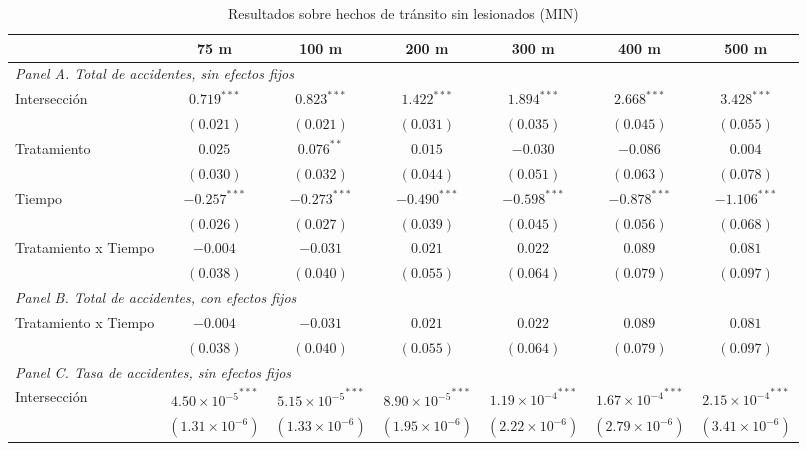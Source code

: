 \begin{table}[htbp]
    \centering
    \caption{Resultados sobre hechos de tránsito sin lesionados (MIN)}
    \label{tab:results-main-min}
    \footnotesize
    \begin{adjustbox}{max width=\textwidth}
    \begin{tabular}{lcccccc}
        \toprule
        & 75 m & 100 m & 200 m & 300 m & 400 m & 500 m \\
        \midrule
        \multicolumn{7}{l}{\textit{Panel A. Total de accidentes, sin efectos fijos}} \\
        Intersección & ${0.719}^{***}$ & ${0.823}^{***}$ & ${1.422}^{***}$ & ${1.894}^{***}$ & ${2.668}^{***}$ & ${3.428}^{***}$ \\
         & $(0.021)$ & $(0.021)$ & $(0.031)$ & $(0.035)$ & $(0.045)$ & $(0.055)$ \\
        Tratamiento & $0.025$ & ${0.076}^{**}$ & $0.015$ & $-0.030$ & $-0.086$ & $0.004$ \\
         & $(0.030)$ & $(0.032)$ & $(0.044)$ & $(0.051)$ & $(0.063)$ & $(0.078)$ \\
        Tiempo & ${-0.257}^{***}$ & ${-0.273}^{***}$ & ${-0.490}^{***}$ & ${-0.598}^{***}$ & ${-0.878}^{***}$ & ${-1.106}^{***}$ \\
         & $(0.026)$ & $(0.027)$ & $(0.039)$ & $(0.045)$ & $(0.056)$ & $(0.068)$ \\
        Tratamiento x Tiempo & $-0.004$ & $-0.031$ & $0.021$ & $0.022$ & $0.089$ & $0.081$ \\
         & $(0.038)$ & $(0.040)$ & $(0.055)$ & $(0.064)$ & $(0.079)$ & $(0.097)$ \\
        \midrule
        \multicolumn{7}{l}{\textit{Panel B. Total de accidentes, con efectos fijos}} \\
        Tratamiento x Tiempo & $-0.004$ & $-0.031$ & $0.021$ & $0.022$ & $0.089$ & $0.081$ \\
         & $(0.038)$ & $(0.040)$ & $(0.055)$ & $(0.064)$ & $(0.079)$ & $(0.097)$ \\
        \midrule
        \multicolumn{7}{l}{\textit{Panel C. Tasa de accidentes, sin efectos fijos}} \\
        Intersección & ${4.50 \times 10^{-5}}^{***}$ & ${5.15 \times 10^{-5}}^{***}$ & ${8.90 \times 10^{-5}}^{***}$ & ${1.19 \times 10^{-4}}^{***}$ & ${1.67 \times 10^{-4}}^{***}$ & ${2.15 \times 10^{-4}}^{***}$ \\
         & $(1.31 \times 10^{-6})$ & $(1.33 \times 10^{-6})$ & $(1.95 \times 10^{-6})$ & $(2.22 \times 10^{-6})$ & $(2.79 \times 10^{-6})$ & $(3.41 \times 10^{-6})$ \\

\end{tabular}
\end{adjustbox}
\end{table}
